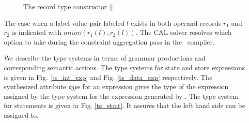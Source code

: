 \begin{figure}%
\noindent{}
\caption{The record type constructor $||$\label{rec_construc}}
\end{figure}

The case when a label-value pair labeled $l$ exists in both operand records $r_1$ and $r_2$ is indicated with $union(r_1(l),r_2(l))$. The CAL solver resolves which option to take during the constraint aggregation pass in the \ak\ compiler.

We describe the type systems in terms of grammar productions and corresponding semantic actions. The type systems for state and store expressions is given in Fig. \ref{ts_int_exp} and Fig. \ref{ts_data_exp} respectively. The synthesized attribute \emph{type} for an expression  gives the type of the expression assigned by the type system for the expression generated by . The type system for statements is given in Fig. \ref{ts_stmt}. It assures that the left hand side can be assigned to.


